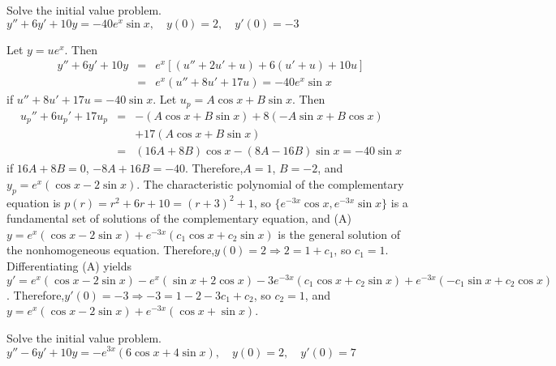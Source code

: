 \documentclass{ximera}
\begin{document}
\begin{problem}\label{exer:5.5.24} Solve the
initial value problem. $y''+6y'+10y=-40e^x\sin x, \quad  y(0)=2,\quad y'(0)=-3$

\begin{solution}
    Let $y=ue^x$. Then
\begin{eqnarray*}
y''+6y'+10y&=&e^x\left[(u''+2u'+u)+6(u'+u)+10u\right]\\
&=&e^x(u''+8u'+17u)=
-40e^x\sin x
\end{eqnarray*}
 if  $u''+8u'+17u=-40\sin x$.
Let $u_p=A\cos x+B\sin x$. Then
\begin{eqnarray*}
u_p''+6u_p'+17u_p&=&-(A\cos x+B\sin x)+8(-A\sin x+B\cos x)\\
&&+17(A\cos x+B\sin x)\\ &=& (16A+8B)\cos x-(8A-16B)\sin
x=-40\sin x
\end{eqnarray*}
if $16A+8B=0$, $-8A+16B=-40$. Therefore,$A=1$, $B=-2$, and
$y_p=e^x(\cos x-2\sin x)$. The characteristic polynomial of the
complementary equation is $p(r)=r^2+6r+10=(r+3)^2+1$, so
$\{e^{-3x}\cos x,e^{-3x}\sin x\}$ is a fundamental set of solutions
of the complementary equation, and (A) $y=e^x(\cos x-2\sin
x)+e^{-3x}(c_1\cos x+c_2\sin x)$ is the general solution of the
nonhomogeneous equation. Therefore,$y(0)=2\Rightarrow 2=1+c_1$, so
$c_1=1$. Differentiating (A) yields $y'=e^x(\cos x-2\sin x)-e^x(\sin
x+2\cos x) -3e^{-3x}(c_1\cos x+c_2\sin x) +e^{-3x}(-c_1\sin x+c_2\cos
x)$. Therefore,$y'(0)=-3\Rightarrow -3=1-2-3c_1+c_2$, so $c_2=1$, and
$y=e^x(\cos x-2\sin x)+e^{-3x}(\cos x+\sin x)$.
\end{solution}
\end{problem}

\begin{problem}\label{exer:5.5.25} Solve the
initial value problem. $y''-6y'+10y=-e^{3x}(6\cos x+4\sin
x), \quad  y(0)=2,\quad y'(0)=7$
\end{problem}
\end{document}
